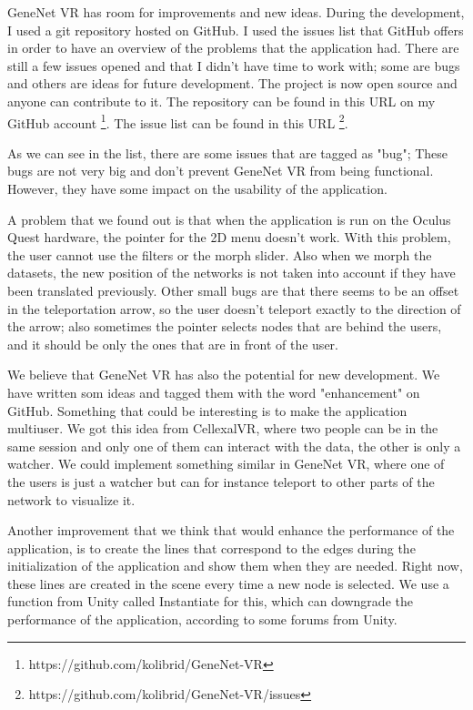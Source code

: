 GeneNet VR has room for improvements and new ideas. During the development, I used a git repository hosted on GitHub. I used the issues list that GitHub offers in order to have an overview of the problems that the application had. There are still a few issues opened and that I didn't have time to work with; some are bugs and others are ideas for future development. The project is now open source and anyone can contribute to it. The repository can be found in this URL on my GitHub account \footnote{https://github.com/kolibrid/GeneNet-VR}. The issue list can be found in this URL  \footnote{https://github.com/kolibrid/GeneNet-VR/issues}.

As we can see in the list, there are some issues that are tagged as "bug"; These bugs are not very big and don't prevent GeneNet VR from being functional. However, they have some impact on the usability of the application.

A problem that we found out is that when the application is run on the Oculus Quest hardware, the pointer for the 2D menu doesn't work. With this problem, the user cannot use the filters or the morph slider. Also when we morph the datasets, the new position of the networks is not taken into account if they have been translated previously. Other small bugs are that there seems to be an offset in the teleportation arrow, so the user doesn't teleport exactly to the direction of the arrow; also sometimes the pointer selects nodes that are behind the users, and it should be only the ones that are in front of the user.

We believe that GeneNet VR has also the potential for new development. We have written som ideas and tagged them with the word "enhancement" on GitHub. Something that could be interesting is to make the application multiuser. We got this idea from CellexalVR\cite{cellexalvr}, where two people can be in the same session and only one of them can interact with the data, the other is only a watcher. We could implement something similar in GeneNet VR, where one of the users is just a watcher but can for instance teleport to other parts of the network to visualize it.

Another improvement that we think that would enhance the performance of the application, is to create the lines that correspond to the edges during the initialization of the application and show them when they are needed. Right now, these lines are created in the scene every time a new node is selected. We use a function from Unity called Instantiate for this, which can downgrade the performance of the application, according to some forums from Unity.

